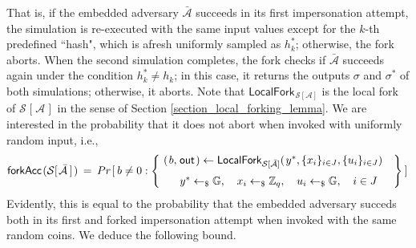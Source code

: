 \documentclass[psamsfonts, reqno]{amsart}
\theoremstyle{definition}
\theoremstyle{remark}
\numberwithin{equation}{section}
\begin{document}
\noindent
That is, if the embedded adversary
$\mathcal{\bar{A}}$ succeeds in its first
impersonation attempt,
the simulation is re-executed with the same input values except
for the $k$-th predefined ``hash",
which is afresh uniformly sampled as $h_k^*$;
otherwise, the fork aborts.
When the second simulation completes,
the fork checks if $\mathcal{\bar{A}}$
succeeds again under the condition $h_k^* \neq h_k$;
in this case, it returns the outputs
$\sigma$ and $\sigma^*$ of both simulations;
otherwise, it aborts. Note that
$
\textsf{LocalFork}_{
		\hspace{1pt}
    	\mathcal{S}\hspace{0pt}[
    		\hspace{0pt}
    		\mathcal{A}
    		\hspace{0pt}
    	]
    }
$
is the local fork of
$
\mathcal{S}\hspace{1pt}[\hspace{1pt}\mathcal{A}\hspace{1pt}]
$
in the sense of Section \ref{section_local_forking_lemma}.
We are interested in the probability that it
does not abort when invoked with uniformly random input, i.e.,
\vspace{8pt}
\begin{equation*}
\mathsf{forkAcc}\hspace{1pt}(
	\mathcal{S}
	[\hspace{1pt}
		\mathcal{\bar{A}}
	\hspace{2pt}]
\hspace{1pt})
\hspace{2pt}
=
\hspace{2pt}
Pr\hspace{1pt}[\hspace{2pt}b \neq 0 :
\begin{Bmatrix}
\ (\hspace{1pt}b, \hspace{1pt}\mathsf{out}\hspace{1pt}) \leftarrow
\mathsf{LocalFork}_{\mathcal{S}[\mathcal{\bar{A}}]}(\hspace{1pt}
y^*, \{x_i\}_{i \in J},\{u_i\}_{i \in J})\ \ \ \\[7pt]
\ y^* \leftarrow_\$ \mathbb{G},
\ \ \ x_i \leftarrow_\$ \mathbb{Z}_q,
\ \ \ u_i \leftarrow_\$ \mathbb{G},
\ \ \ i \in J
\end{Bmatrix}
\hspace{2pt}]\hspace{1pt}
\vspace{8pt}
\end{equation*}
\noindent
Evidently,
this is equal to the probability that the embedded adversary
succeds both in its first and forked impersonation attempt
when invoked with the same random coins.
We deduce the following bound.
\end{document}
